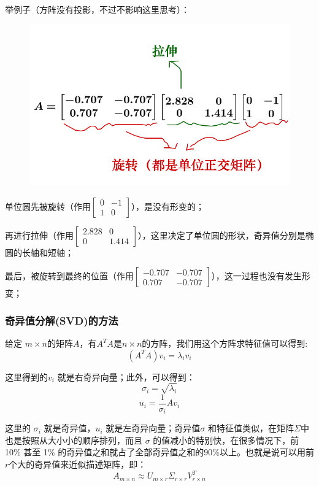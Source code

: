 \documentclass[12pt]{article}
\begin{document}
举例子（方阵没有投影，不过不影响这里思考）：
\begin{figure}[H]
    \centering
    \includegraphics[width=.8\textwidth]{fig/UnderstandSingularValue_6.png}
\end{figure} 

单位圆先被旋转（作用$\begin{bmatrix}0&-1\\1&0\end{bmatrix}$），是没有形变的；

再进行拉伸（作用$\begin{bmatrix}2.828&0\\0&1.414\end{bmatrix}$），这里决定了单位圆的形状，奇异值分别是椭圆的长轴和短轴；

最后，被旋转到最终的位置（作用$\begin{bmatrix}-0.707&-0.707\\0.707&-0.707\end{bmatrix}$），这一过程也没有发生形变；

\subsubsection{奇异值分解(SVD)的方法}
给定 $m\times n$的矩阵$A$，有$A^TA$是$n\times n$的方阵，我们用这个方阵求特征值可以得到:
$$
(A^TA)v_i = \lambda_iv_i
$$

这里得到的$v_i$ 就是右奇异向量；此外，可以得到：
$$
\sigma_i = \sqrt{\lambda_i}
$$
$$
u_i = \frac{1}{\sigma_i}Av_i
$$

这里的 $\sigma_i$ 就是奇异值，$u_i$ 就是左奇异向量；奇异值$\sigma$ 和特征值类似，在矩阵$\Sigma$中也是按照从大小小的顺序排列，而且 $\sigma$ 的值减小的特别快，在很多情况下，前 10\% 甚至 1\% 的奇异值之和就占了全部奇异值之和的90\%以上。也就是说可以用前 $r$个大的奇异值来近似描述矩阵，即：
$$
A_{m\times n} \approx U_{m\times r}\Sigma_{r\times r}V^T_{r\times n}
$$
\end{document}
